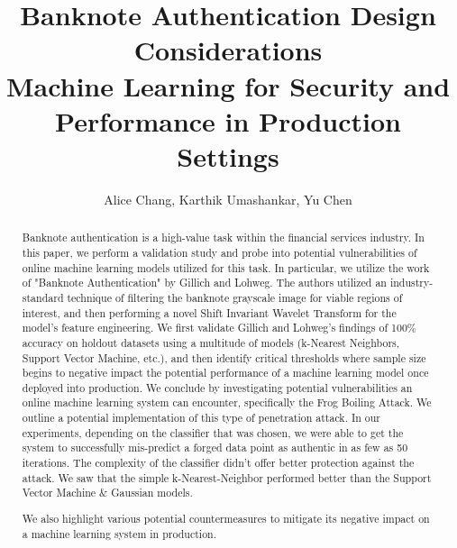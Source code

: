 \documentclass{article}
\begin{document}
\title{%
  \textbf{Banknote Authentication Design Considerations} \\
  \large Machine Learning for Security and  \\
    Performance in Production Settings}
\author{Alice Chang, Karthik Umashankar, Yu Chen}
\maketitle

\begin{abstract}
Banknote authentication is a high-value task within the financial services industry. In this paper, we perform a validation study and probe into potential vulnerabilities of online machine learning models utilized for this task. In particular, we utilize the work of "Banknote Authentication" by Gillich and Lohweg\cite{original_paper}. The authors utilized an industry-standard technique of filtering the banknote grayscale image for viable regions of interest, and then performing a novel Shift Invariant Wavelet Transform for the model's feature engineering. We first validate Gillich and Lohweg's findings of 100\% accuracy on holdout datasets using a multitude of models (k-Nearest Neighbors, Support Vector Machine, etc.), and then identify critical thresholds where sample size begins to negative impact the potential performance of a machine learning model once deployed into production.
\newline\newline
We conclude by investigating potential vulnerabilities an online machine learning system can encounter, specifically the Frog Boiling Attack. We outline a potential implementation of this type of penetration attack. In our experiments, depending on the classifier that was chosen, we were able to get the system to successfully mis-predict a forged data point as authentic in as few as 50 iterations. The complexity of the classifier didn’t offer better protection against the attack. We saw that the simple k-Nearest-Neighbor performed better than the Support Vector Machine \& Gaussian models.

We also highlight various potential countermeasures to mitigate its negative impact on a machine learning system in production.
\end{abstract}
\end{document}
